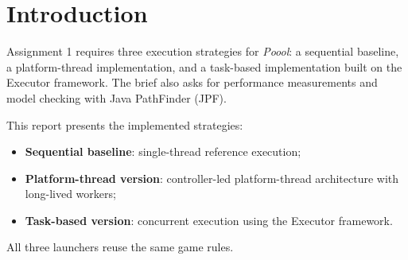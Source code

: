 \section{Introduction}

Assignment 1 requires three execution strategies for \emph{Poool}: a sequential baseline, a platform-thread implementation, and a task-based implementation built on the Executor framework. The brief also asks for performance measurements and model checking with Java PathFinder (JPF).

This report presents the implemented strategies:

\begin{itemize}
    \item \textbf{Sequential baseline}: single-thread reference execution;
    \item \textbf{Platform-thread version}: controller-led platform-thread architecture with long-lived workers;
    \item \textbf{Task-based version}: concurrent execution using the Executor framework.
\end{itemize}

All three launchers reuse the same game rules.